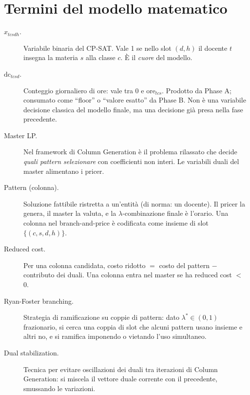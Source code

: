 \section{Termini del modello matematico}

\begin{description}
\item[$x_{tcsdh}$.]
  Variabile binaria del CP-SAT. Vale 1 se nello slot
  $(d,h)$ il docente $t$ insegna la materia $s$ alla
  classe $c$. \`E il \emph{cuore} del modello.

\item[$\text{dc}_{tcsd}$.]
  Conteggio giornaliero di ore: vale tra 0 e
  $\text{ore}_{tcs}$. Prodotto da Phase A; consumato come
  ``floor'' o ``valore esatto'' da Phase B. Non \`e una
  variabile decisione classica del modello finale, ma una
  decisione gi\`a presa nella fase precedente.

\item[Master LP.]
  Nel framework di Column Generation \`e il problema
  rilassato che decide \emph{quali pattern selezionare}
  con coefficienti non interi. Le variabili duali del
  master alimentano i pricer.

\item[Pattern (colonna).]
  Soluzione fattibile ristretta a un'entit\`a (di norma:
  un docente). Il pricer la genera, il master la valuta,
  e la $\lambda$-combinazione finale \`e l'orario. Una
  colonna nel branch-and-price \`e codificata come
  insieme di slot $\{(c,s,d,h)\}$.

\item[Reduced cost.]
  Per una colonna candidata, costo ridotto $=$ costo del
  pattern $-$ contributo dei duali. Una colonna entra nel
  master se ha reduced cost $<\,$0.

\item[Ryan-Foster branching.]
  Strategia di ramificazione su coppie di pattern: dato
  $\lambda^* \in (0,1)$ frazionario, si cerca una coppia
  di slot che alcuni pattern usano insieme e altri no, e
  si ramifica imponendo o vietando l'uso simultaneo.

\item[Dual stabilization.]
  Tecnica per evitare oscillazioni dei duali tra iterazioni
  di Column Generation: si miscela il vettore duale
  corrente con il precedente, smussando le variazioni.
\end{description}

